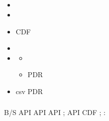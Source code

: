 \documentclass{article}
\begin{document}
\subsection{ }
\subsubsection{ }
 
\begin{itemize}
    \item  
    \item  
    \item  CDF 
    \item  
    \item  
        \begin{itemize}
        \item  
        \item  PDR 
        \end{itemize}
    \item  csv PDR 
\end{itemize}
%  
\subsubsection{ }
 B/S API   API API ; API CDF ; : 

\subsection{ }
\subsubsection{ }
\subsubsection{ }

\sectionbreak
\section{ }
\subsection{ }
\end{document}
